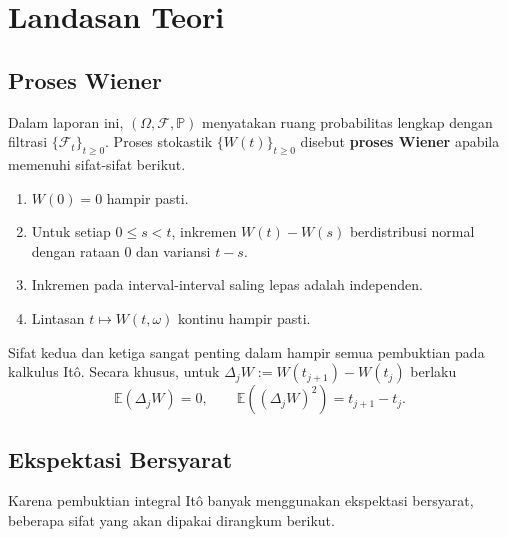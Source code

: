 \documentclass[12pt,a4paper]{article}
\theoremstyle{definition}
\theoremstyle{plain}
\newcommand{\E}{\mathbb{E}}
\newcommand{\PP}{\mathbb{P}}
\newcommand{\F}{\mathcal{F}}
\begin{document}
\section{Landasan Teori}

\subsection{Proses Wiener}

Dalam laporan ini, $(\Omega,\F,\PP)$ menyatakan ruang probabilitas lengkap
dengan filtrasi $\{\F_t\}_{t\ge 0}$. Proses stokastik $\{W(t)\}_{t\ge 0}$
disebut \textbf{proses Wiener} apabila memenuhi sifat-sifat berikut.
\begin{enumerate}[label=\alph*.]
  \item $W(0)=0$ hampir pasti.
  \item Untuk setiap $0\le s<t$, inkremen $W(t)-W(s)$ berdistribusi normal
        dengan rataan $0$ dan variansi $t-s$.
  \item Inkremen pada interval-interval saling lepas adalah independen.
  \item Lintasan $t\mapsto W(t,\omega)$ kontinu hampir pasti.
\end{enumerate}

Sifat kedua dan ketiga sangat penting dalam hampir semua pembuktian pada
kalkulus It\^o. Secara khusus, untuk $\Delta_jW:=W(t_{j+1})-W(t_j)$ berlaku
\[
  \E(\Delta_jW)=0,
  \qquad
  \E((\Delta_jW)^2)=t_{j+1}-t_j.
\]

\subsection{Ekspektasi Bersyarat}

Karena pembuktian integral It\^o banyak menggunakan ekspektasi bersyarat,
beberapa sifat yang akan dipakai dirangkum berikut.
\end{document}
